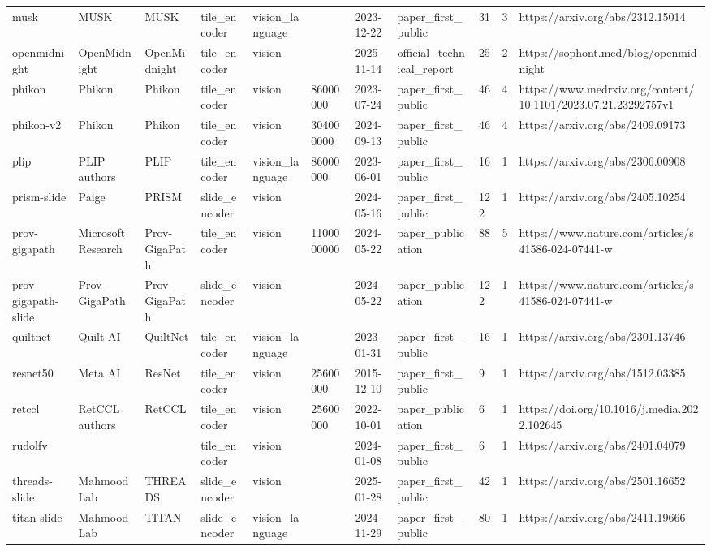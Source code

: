 \begin{longtable}{lllllllllll}
musk & MUSK & MUSK & tile\_encoder & vision\_language &  & 2023-12-22 & paper\_first\_public & 31 & 3 & https://arxiv.org/abs/2312.15014 \\
openmidnight & OpenMidnight & OpenMidnight & tile\_encoder & vision &  & 2025-11-14 & official\_technical\_report & 25 & 2 & https://sophont.med/blog/openmidnight \\
phikon & Phikon & Phikon & tile\_encoder & vision & 86000000 & 2023-07-24 & paper\_first\_public & 46 & 4 & https://www.medrxiv.org/content/10.1101/2023.07.21.23292757v1 \\
phikon-v2 & Phikon & Phikon & tile\_encoder & vision & 304000000 & 2024-09-13 & paper\_first\_public & 46 & 4 & https://arxiv.org/abs/2409.09173 \\
plip & PLIP authors & PLIP & tile\_encoder & vision\_language & 86000000 & 2023-06-01 & paper\_first\_public & 16 & 1 & https://arxiv.org/abs/2306.00908 \\
prism-slide & Paige & PRISM & slide\_encoder & vision &  & 2024-05-16 & paper\_first\_public & 122 & 1 & https://arxiv.org/abs/2405.10254 \\
prov-gigapath & Microsoft Research & Prov-GigaPath & tile\_encoder & vision & 1100000000 & 2024-05-22 & paper\_publication & 88 & 5 & https://www.nature.com/articles/s41586-024-07441-w \\
prov-gigapath-slide & Prov-GigaPath & Prov-GigaPath & slide\_encoder & vision &  & 2024-05-22 & paper\_publication & 122 & 1 & https://www.nature.com/articles/s41586-024-07441-w \\
quiltnet & Quilt AI & QuiltNet & tile\_encoder & vision\_language &  & 2023-01-31 & paper\_first\_public & 16 & 1 & https://arxiv.org/abs/2301.13746 \\
resnet50 & Meta AI & ResNet & tile\_encoder & vision & 25600000 & 2015-12-10 & paper\_first\_public & 9 & 1 & https://arxiv.org/abs/1512.03385 \\
retccl & RetCCL authors & RetCCL & tile\_encoder & vision & 25600000 & 2022-10-01 & paper\_publication & 6 & 1 & https://doi.org/10.1016/j.media.2022.102645 \\
rudolfv &  &  & tile\_encoder & vision &  & 2024-01-08 & paper\_first\_public & 6 & 1 & https://arxiv.org/abs/2401.04079 \\
threads-slide & MahmoodLab & THREADS & slide\_encoder & vision &  & 2025-01-28 & paper\_first\_public & 42 & 1 & https://arxiv.org/abs/2501.16652 \\
titan-slide & MahmoodLab & TITAN & slide\_encoder & vision\_language &  & 2024-11-29 & paper\_first\_public & 80 & 1 & https://arxiv.org/abs/2411.19666 \\

\end{longtable}
